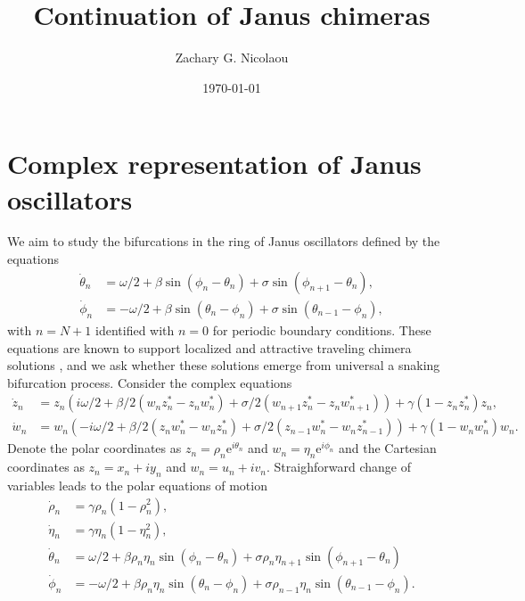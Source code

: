 \documentclass[aps,pre,amsmath,amssymb,floatfix,onecolumn,notitlepage,10pt]{revtex4-1}
\begin{document}
\title{Continuation of Janus chimeras}
\author{Zachary G. Nicolaou}
\date{\today}

\maketitle

\section{Complex  representation of Janus oscillators}
We aim to study the bifurcations in the ring of Janus oscillators defined by the equations
\begin{align}
\dot{\theta}_n &= \omega/2 + \beta\sin(\phi_n - \theta_n) + \sigma \sin(\phi_{n+1}-\theta_n), \label{janus1}\\
\dot{\phi}_n &= -\omega/2 + \beta\sin(\theta_n - \phi_n) + \sigma \sin(\theta_{n-1}-\phi_n), \label{janus2}
\end{align}
with $n=N+1$ identified with $n=0$ for periodic boundary conditions. These equations are known to support localized and attractive traveling chimera solutions \cite{2019_Nicolaou}, and we ask whether these solutions emerge from universal a snaking bifurcation process.
Consider the complex equations
\begin{align}
\dot z_n &= z_n\left( i\omega/2 + \beta/2\left(w_nz_n^*-z_nw_n^*\right) + \sigma/2\left(w_{n+1}z_n^*-z_nw_{n+1}^*\right)\right) + \gamma\left(1-z_nz_n^*\right)z_n, \label{eom1} \\
\dot w_n &= w_n\left( -i\omega/2 + \beta/2\left(z_nw_n^*-w_nz_n^*\right) + \sigma/2\left(z_{n-1}w_n^*-w_nz_{n-1}^*\right)\right) + \gamma\left(1-w_nw_n^*\right)w_n. \label{eom2}
\end{align}
Denote the polar coordinates as $z_n = \rho_n{\mathrm e}^{i\theta_n}$ and $w_n = \eta_n{\mathrm e}^{i\phi_n}$ and the Cartesian coordinates as $z_n = x_n + iy_n$ and $w_n = u_n+iv_n$. Straighforward change of variables leads to the polar equations of motion
\begin{align}
\dot \rho_n &= \gamma \rho_n \left(1-\rho_n^2\right), \\
\dot \eta_n &=  \gamma \eta_n \left(1-\eta_n^2\right),  \\
\dot \theta_n &= \omega/2 + \beta \rho_n \eta_n \sin\left(\phi_n-\theta_n\right) + \sigma \rho_n\eta_{n+1}\sin\left(\phi_{n+1}-\theta_n\right)\\
\dot \phi_n &= -\omega/2 + \beta \rho_n \eta_n \sin\left(\theta_n-\phi_n\right) + \sigma \rho_{n-1} \eta_n\sin\left(\theta_{n-1}-\phi_n\right).
\end{align}
\end{document}
